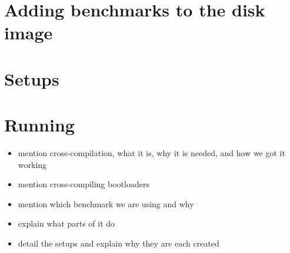 \section{Adding benchmarks to the disk image}

\section{Setups}

\section{Running}

\begin{itemize}
    \item mention cross-compilation, what it is, why it is needed, and how we
          got it working
    \item mention cross-compiling bootloaders
    \item mention which benchmark we are using and why
    \item explain what parts of it do
    \item detail the setups and explain why they are each created
\end{itemize}